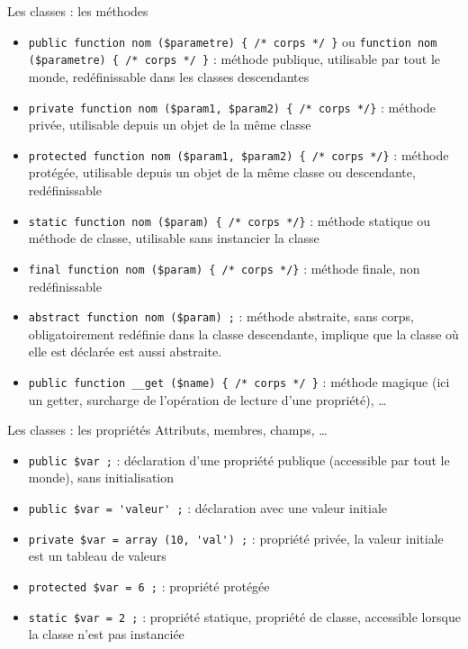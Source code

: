 \begin{frame}[containsverbatim]{Les classes : les méthodes}
\begin{itemize}
\item \lstinline!public function nom ($parametre) { /* corps */ }! ou \lstinline!function nom ($parametre) { /* corps */ }! : méthode publique, utilisable par tout le monde, redéfinissable dans les classes descendantes
\item \lstinline!private function nom ($param1, $param2) { /* corps */}! : méthode privée, utilisable depuis un objet de la même classe
\item \lstinline!protected function nom ($param1, $param2) { /* corps */}! : méthode protégée, utilisable depuis un objet de la même classe ou descendante, redéfinissable
\item \lstinline!static function nom ($param) { /* corps */}! : méthode statique ou méthode de classe, utilisable sans instancier la classe
\item \lstinline!final function nom ($param) { /* corps */}! : méthode finale, non redéfinissable
\item \lstinline!abstract function nom ($param) ;! : méthode abstraite, sans corps, obligatoirement redéfinie dans la classe descendante, implique que la classe où elle est déclarée est aussi abstraite.
\item \lstinline!public function __get ($name) { /* corps */ }! : méthode magique (ici un getter, surcharge de l'opération de lecture d'une propriété), \ldots
\end{itemize}
\end{frame}

\begin{frame}[containsverbatim]{Les classes : les propriétés}
Attributs, membres, champs, \ldots
\begin{itemize}
\item \lstinline!public $var ;! : déclaration d'une propriété publique (accessible par tout le monde), sans initialisation
\item \lstinline!public $var = 'valeur' ;! : déclaration avec une valeur initiale
\item \lstinline!private $var = array (10, 'val') ;! : propriété privée, la valeur initiale est un tableau de valeurs
\item \lstinline!protected $var = 6 ;! : propriété protégée
\item \lstinline!static $var = 2 ;! : propriété statique, propriété de classe, accessible lorsque la classe n'est pas instanciée
\end{itemize}
\end{frame}

